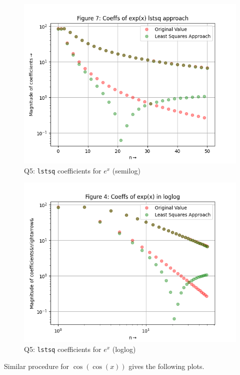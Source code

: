 \documentclass[11pt, a4paper]{article}
\begin{document}
   \begin{figure}[!tbh]
   	\centering
  \includegraphics[scale=0.5]{q5-exp-semilog.png} 
    \caption{Q5: \texttt{lstsq} coefficients for $e^x$ (semilog)}
   	\label{fig:lstsq coeff for exp()}
   \end{figure}
   
   \begin{figure}[!tbh]
   	\centering
  \includegraphics[scale=0.5]{q5-exp-loglog.png} 
    \caption{Q5: \texttt{lstsq} coefficients for $e^x$ (loglog)}
   	\label{fig:lstsq coeff for exp()}
   \end{figure}
 
 Similar procedure for $\cos(\cos(x))$ gives the following plots. 
 
\end{document}
